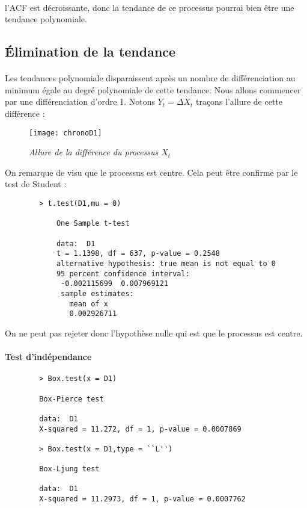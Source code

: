         \paragraph{}l'ACF est décroissante, donc la tendance de ce processus
        pourrai bien être une tendance polynomiale. 
        

    \subsection{Élimination de la tendance}
        \paragraph{} Les tendances polynomiale disparaissent après un nombre de
        différenciation au minimum égale au degré polynomiale de cette tendance.
        Nous allons commencer par une différenciation d'ordre 1. Notons $Y_t=\Delta X_t$
        traçons l'allure de cette différence :

        \begin{figure}[H]
            \centering 
            \label{fig:chronoD1} 
            \texttt{[image: chronoD1]} 
            \caption{\it Allure de la différence du processus $X_t$ } 
        \end{figure} 

        On remarque de visu que le processus est centre. Cela peut être confirme par
        le test de Student :
        \begin{verbatim}
        > t.test(D1,mu = 0)

            One Sample t-test

            data:  D1
            t = 1.1398, df = 637, p-value = 0.2548
            alternative hypothesis: true mean is not equal to 0
            95 percent confidence interval:
             -0.002115699  0.007969121
             sample estimates:
               mean of x 
               0.002926711 

        \end{verbatim}
        On ne peut pas rejeter donc l'hypothèse nulle qui est que le processus
        est centre.
        \paragraph{Test d'indépendance}

        \begin{verbatim}
        > Box.test(x = D1)

        Box-Pierce test

        data:  D1
        X-squared = 11.272, df = 1, p-value = 0.0007869

        > Box.test(x = D1,type = ``L'')

        Box-Ljung test

        data:  D1
        X-squared = 11.2973, df = 1, p-value = 0.0007762

        \end{verbatim}
        
